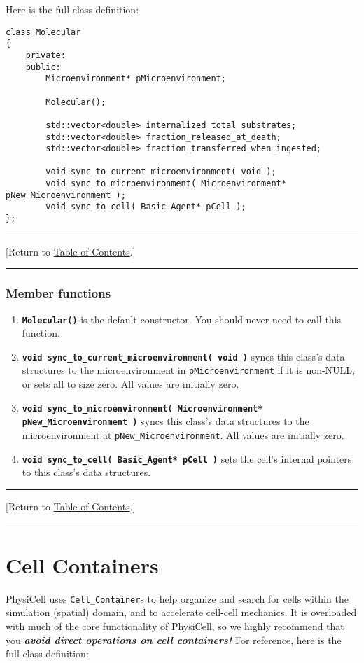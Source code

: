 \documentclass[12pt]{article}
\renewcommand{\v}{\verb}
\newcommand{\smallcode}[1]{\textbf{\texttt{#1}}}
\newcommand{\TOClink}{\begin{center}\hrule\vskip-5pt\phantom{.}\hfill[Return to \hyperlink{TOC}{Table of Contents}.]\hfill\phantom{.}\vskip3pt\hrule\end{center}}
\begin{document}
Here is the full class definition:

\begin{verbatim}
class Molecular
{
    private:
    public: 
        Microenvironment* pMicroenvironment; 
    
        Molecular(); 
     
        std::vector<double> internalized_total_substrates; 
        std::vector<double> fraction_released_at_death; 
        std::vector<double> fraction_transferred_when_ingested; 
        
        void sync_to_current_microenvironment( void );
        void sync_to_microenvironment( Microenvironment* pNew_Microenvironment );
        void sync_to_cell( Basic_Agent* pCell );        
};
\end{verbatim}

\TOClink 
\subsubsection{Member functions}
\label{sec:molecular_functions}

\begin{enumerate}
\item
\smallcode{Molecular()} is the default constructor. You should never need to call this function. 

\item 
\smallcode{void sync\_to\_current\_microenvironment( void )} syncs this class's data structures 
to the microenvironment in \v|pMicroenvironment| if it is non-NULL, or sets all to size zero. 
All values are initially zero. 

\item 
\smallcode{void sync\_to\_microenvironment( Microenvironment* pNew\_Microenvironment )}  
syncs this class's data structures to the microenvironment at \v|pNew_Microenvironment|. 
All values are initially zero. 

\item 
\smallcode{void sync\_to\_cell( Basic\_Agent* pCell )} sets the cell's internal pointers 
to this class's data structures. 

\end{enumerate}


\TOClink 

\section{Cell Containers}
\label{sec:Cell_Container}
PhysiCell uses \v|Cell_Container|s to help organize and 
search for cells within the simulation (spatial) domain, and to 
accelerate cell-cell mechanics. It is overloaded with much of the 
core functionality of PhysiCell, so we highly recommend that you 
\emph{\textbf{avoid direct operations on cell containers!}}  
For reference, here is the full class definition: 
\end{document}
